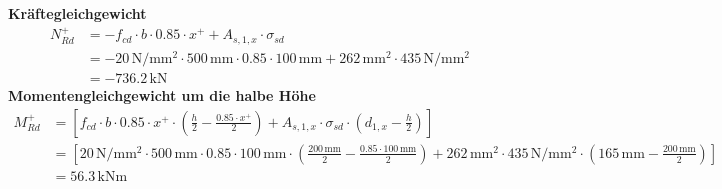 \documentclass[11pt,a4paper]{article}
\begin{document}
\noindent\textbf{Kräftegleichgewicht}
\begin{equation*}
\begin{aligned}
  N_{Rd}^{+} &= -f_{cd} \cdot b \cdot 0.85 \cdot x^{+} + A_{s,1,x} \cdot \sigma_{sd} \\
  &= -20\,\mathrm{N}/\mathrm{mm}^{2} \cdot 500\,\mathrm{mm} \cdot 0.85 \cdot 100\,\mathrm{mm} + 262\,\mathrm{mm}^{2} \cdot 435\,\mathrm{N}/\mathrm{mm}^{2} \\
  &= -736.2\,\mathrm{kN}
\end{aligned}
\end{equation*}
\noindent\textbf{Momentengleichgewicht um die halbe Höhe}
\begin{equation*}
\begin{aligned}
  M_{Rd}^{+} &= \left[f_{cd} \cdot b \cdot 0.85 \cdot x^{+} \cdot \left(\tfrac{h}{2} - \tfrac{0.85 \cdot x^{+}}{2}\right) + A_{s,1,x} \cdot \sigma_{sd} \cdot \left(d_{1,x} - \tfrac{h}{2}\right)\right] \\
  &= \left[20\,\mathrm{N}/\mathrm{mm}^{2} \cdot 500\,\mathrm{mm} \cdot 0.85 \cdot 100\,\mathrm{mm} \cdot \left(\tfrac{200\,\mathrm{mm}}{2} - \tfrac{0.85 \cdot 100\,\mathrm{mm}}{2}\right) + 262\,\mathrm{mm}^{2} \cdot 435\,\mathrm{N}/\mathrm{mm}^{2} \cdot \left(165\,\mathrm{mm} - \tfrac{200\,\mathrm{mm}}{2}\right)\right] \\
  &= 56.3\,\mathrm{kNm}
\end{aligned}
\end{equation*}
\end{document}

